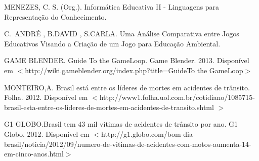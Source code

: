 \documentclass[
	article,			%
	11pt,				%
	oneside,			%
	a4paper,			%
	english,			%
	brazil,				%
	]{abntex2}
\begin{document}



\begin{thebibliography}{1}

MENEZES, C. S. (Org.).
\newblock Informática Educativa II - Linguagens para
Representação do Conhecimento.

C.~ANDRÉ , B.DAVID , S.CARLA.
\newblock Uma Análise Comparativa entre Jogos Educativos
Visando a Criação de um Jogo para Educação Ambiental.


GAME BLENDER. Guide To the GameLoop. Game Blender. 2013.
\newblock Disponível em $<$http://wiki.gameblender.org/index.php?title=Guide\textunderscore To \textunderscore the \textunderscore GameLoop$>$

MONTEIRO,A. Brasil está entre os líderes de mortes em acidentes de trânsito. Folha. 2012.
\newblock Disponível em $<$http://www1.folha.uol.com.br/cotidiano/1085715-brasil-esta-entre-os-lideres-de-mortes-em-acidentes-de-transito.shtml $>$

G1 GLOBO.Brasil tem 43 mil vítimas de acidentes de trânsito por ano. G1 Globo. 2012. 
\newblock Disponível em $<$http://g1.globo.com/bom-dia-brasil/noticia/2012/09/numero-de-vitimas-de-acidentes-com-motos-aumenta-14-em-cinco-anos.html$>$

\end{thebibliography}
\end{document}

